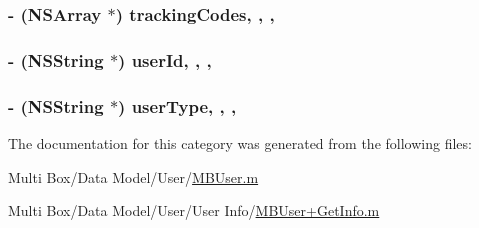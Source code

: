 \hypertarget{category_m_b_user_07_08_ad9df8718131f2681768bf851afb43963}{
\subsubsection[{tracking\-Codes}]{\setlength{\rightskip}{0pt plus 5cm}-\/ (N\-S\-Array $\ast$) tracking\-Codes\hspace{0.3cm}{\ttfamily [read]}, {\ttfamily [write]}, {\ttfamily [nonatomic]}, {\ttfamily [strong]}}}\label{category_m_b_user_07_08_ad9df8718131f2681768bf851afb43963}
\hypertarget{category_m_b_user_07_08_a283433e5becee129a91a7edbce5f3380}{
\subsubsection[{user\-Id}]{\setlength{\rightskip}{0pt plus 5cm}-\/ (N\-S\-String $\ast$) user\-Id\hspace{0.3cm}{\ttfamily [read]}, {\ttfamily [write]}, {\ttfamily [nonatomic]}, {\ttfamily [strong]}}}\label{category_m_b_user_07_08_a283433e5becee129a91a7edbce5f3380}
\hypertarget{category_m_b_user_07_08_a1cf94c9d11f80e81a86397d45539ee2c}{
\subsubsection[{user\-Type}]{\setlength{\rightskip}{0pt plus 5cm}-\/ (N\-S\-String $\ast$) user\-Type\hspace{0.3cm}{\ttfamily [read]}, {\ttfamily [write]}, {\ttfamily [nonatomic]}, {\ttfamily [strong]}}}\label{category_m_b_user_07_08_a1cf94c9d11f80e81a86397d45539ee2c}


The documentation for this category was generated from the following files\-:\begin{DoxyCompactItemize}
\item 
Multi Box/\-Data Model/\-User/\hyperlink{_m_b_user_8m}{M\-B\-User.\-m}\item 
Multi Box/\-Data Model/\-User/\-User Info/\hyperlink{_m_b_user_09_get_info_8m}{M\-B\-User+\-Get\-Info.\-m}\end{DoxyCompactItemize}
